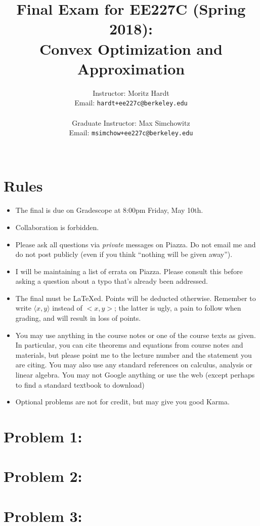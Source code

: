 \documentclass[12pt]{article}
\title{Final Exam for EE227C (Spring 2018):\\
 Convex Optimization and Approximation }
\author{Instructor: Moritz Hardt\\
{\small Email: \tt hardt+ee227c@berkeley.edu}\\ ~\\
Graduate Instructor: Max Simchowitz\\
{\small Email: \tt msimchow+ee227c@berkeley.edu}\\ ~\\
}
\begin{document}


\maketitle

\section*{Rules}
\begin{itemize}
	\item The final is due on Gradescope at 8:00pm Friday, May 10th.
	\item Collaboration is forbidden. 
	\item Please ask all questions via \emph{private} messages on Piazza. Do not email me and do not post publicly (even if you think ``nothing will be given away'').
	\item I will be maintaining a list of errata on Piazza. Please consult this before asking a question about a typo that's already been addressed.
	\item The final must be LaTeXed. Points will be deducted otherwise. Remember to write $\langle x, y \rangle$ instead of $<x,y>$; the latter is ugly, a pain to follow when grading, and will result in loss of points.
	\item You may use anything in the course notes or one of the course texts as given. In particular, you can cite theorems and equations from course notes and materials, but please point me to the lecture number and the statement you are citing. You may also use any standard references on calculus, analysis or linear algebra. You may not Google anything or use the web (except perhaps to find a standard textbook to download)
	\item Optional problems are not for credit, but may give you good Karma.
\end{itemize}
\section*{Problem 1:}
\section*{Problem 2:}
\section*{Problem 3:}
\end{document}
